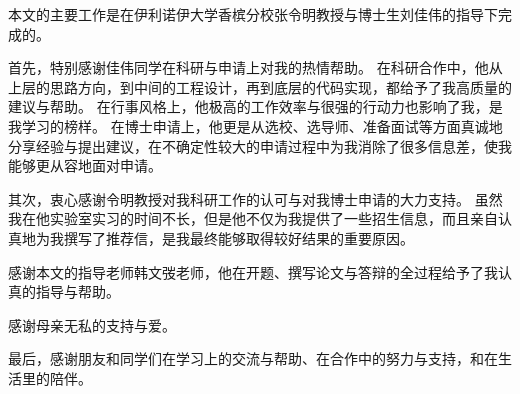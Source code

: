 
\begin{acknowledgements}

本文的主要工作是在伊利诺伊大学香槟分校张令明教授与博士生刘佳伟的指导下完成的。

首先，特别感谢佳伟同学在科研与申请上对我的热情帮助。
在科研合作中，他从上层的思路方向，到中间的工程设计，再到底层的代码实现，都给予了我高质量的建议与帮助。
在行事风格上，他极高的工作效率与很强的行动力也影响了我，是我学习的榜样。
在博士申请上，他更是从选校、选导师、准备面试等方面真诚地分享经验与提出建议，在不确定性较大的申请过程中为我消除了很多信息差，使我能够更从容地面对申请。

其次，衷心感谢令明教授对我科研工作的认可与对我博士申请的大力支持。
虽然我在他实验室实习的时间不长，但是他不仅为我提供了一些招生信息，而且亲自认真地为我撰写了推荐信，是我最终能够取得较好结果的重要原因。

感谢本文的指导老师韩文弢老师，他在开题、撰写论文与答辩的全过程给予了我认真的指导与帮助。

感谢母亲无私的支持与爱。

最后，感谢朋友和同学们在学习上的交流与帮助、在合作中的努力与支持，和在生活里的陪伴。

\end{acknowledgements}

